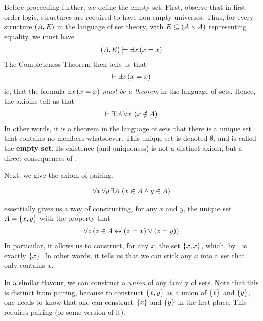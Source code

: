 Before proceeding further, we define the empty set. First, observe that in first order logic, structures are required to have non-empty universes. Thus, for every structure $\left( A, E \right)$ in the language of set theory, with $E \subseteq \left( A \times A \right)$ representing equality, we must have
\begin{align*}
    \left( A, E \right) \models \exists x \left( x = x \right)
\end{align*}
The Completeness Theorem then tells us that
\begin{align*}
    \vdash \exists x \left( x = x \right)
\end{align*}
ie, that the formula $\exists x \left( x = x \right)$ \textit{must be a theorem} in the language of sets. Hence, the axioms  tell us that
\begin{align*}
    \vdash \exists! A \, \forall x \, \left( x \notin A \right)
\end{align*}
In other words, it is a theorem in the language of sets that there is a unique set that contains no members whatsoever. This unique set is denoted $\emptyset$, and is called the \textbf{empty set}. Its existence (and uniqueness) is not a distinct axiom, but a direct consequences of .

Next, we give the axiom of pairing.

\begin{baxiom}\label{ZFC:Pairing}
    \begin{align*}
        \forall x \, \forall y \, \exists A \, \left( x \in A \land y \in A \right)
    \end{align*}
\end{baxiom}

 essentially gives us a way of constructing, for any $x$ and $y$, the unique set $A = \left\{ x, y \right\}$ with the property that
\begin{align*}
    \forall z \left( z \in A \leftrightarrow \left( z = x \right) \lor \left( z = y \right) \right)
\end{align*}
In particular, it allows us to construct, for any $x$, the set $\left\{ x, x \right\}$, which, by , is exactly $\left\{ x \right\}$. In other words, it tells us that we can stick any $x$ into a set that only contains $x$.

In a similar flavour, we can construct a \textit{union} of any family of sets. Note that this is distinct from pairing, because to construct $\left\{ x, y \right\}$ as a union of $\left\{ x \right\}$ and $\left\{ y \right\}$, one needs to know that one can construct $\left\{ x \right\}$ and $\left\{ y \right\}$ in the first place. This requires pairing (or some version of it).

